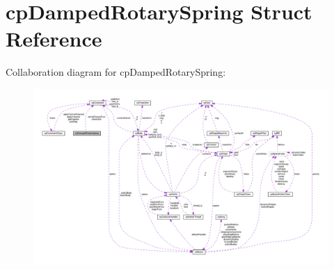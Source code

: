 \hypertarget{structcpDampedRotarySpring}{}\section{cp\+Damped\+Rotary\+Spring Struct Reference}
\label{structcpDampedRotarySpring}


Collaboration diagram for cp\+Damped\+Rotary\+Spring\+:
\nopagebreak
\begin{figure}[H]
\begin{center}
\leavevmode
\includegraphics[width=350pt]{structcpDampedRotarySpring__coll__graph}
\end{center}
\end{figure}
